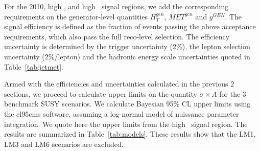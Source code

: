 For the 2010, high \met, and high \Ht\ signal regions, we add the corresponding
requirements on the generator-level quantities $H_{T}^{gen}$, $MET^{gen}$ and $y^{GEN}$.
The signal efficiency is defined as the fraction of events passing the above acceptance requirements, which
also pass the full reco-level selection. The efficiency uncertainty is determined by the trigger uncertainty (2\%),
the lepton selection uncertainty (2\%/lepton) and the hadronic energy scale uncertainties quoted in Table~\ref{tab:jetmet}.

Armed with the efficiencies and uncertainties calculated in the previous 2 sections, we proceed
to calculate upper limits on the quantity $\sigma \times A$ for the 3 benchmark SUSY 
scenarios. We calculate Bayesian 95\% CL upper
limits using the cl95cms software, assuming a log-normal model of nuissance parameter integration.
We quote here the upper limits from the high \Ht\ signal region.
The results are summarized in
Table~\ref{tab:models}. These results show that the LM1, LM3 and LM6 scenarios are excluded.


